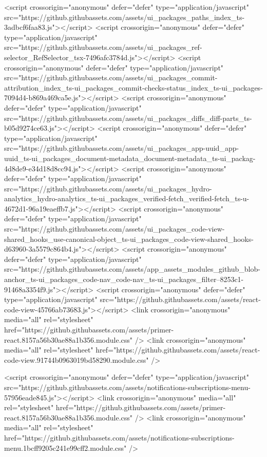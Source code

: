 <script crossorigin="anonymous" defer="defer" type="application/javascript" src="https://github.githubassets.com/assets/ui_packages_paths_index_ts-3adbcf6faa83.js"></script>
<script crossorigin="anonymous" defer="defer" type="application/javascript" src="https://github.githubassets.com/assets/ui_packages_ref-selector_RefSelector_tsx-7496afc3784d.js"></script>
<script crossorigin="anonymous" defer="defer" type="application/javascript" src="https://github.githubassets.com/assets/ui_packages_commit-attribution_index_ts-ui_packages_commit-checks-status_index_ts-ui_packages-7094d4-b869a469ca5e.js"></script>
<script crossorigin="anonymous" defer="defer" type="application/javascript" src="https://github.githubassets.com/assets/ui_packages_diffs_diff-parts_ts-b05d9274ce63.js"></script>
<script crossorigin="anonymous" defer="defer" type="application/javascript" src="https://github.githubassets.com/assets/ui_packages_app-uuid_app-uuid_ts-ui_packages_document-metadata_document-metadata_ts-ui_packag-4d8de9-e34d18d8cc94.js"></script>
<script crossorigin="anonymous" defer="defer" type="application/javascript" src="https://github.githubassets.com/assets/ui_packages_hydro-analytics_hydro-analytics_ts-ui_packages_verified-fetch_verified-fetch_ts-u-4672d1-96a19eaeffb7.js"></script>
<script crossorigin="anonymous" defer="defer" type="application/javascript" src="https://github.githubassets.com/assets/ui_packages_code-view-shared_hooks_use-canonical-object_ts-ui_packages_code-view-shared_hooks-d63960-3a5579c864b4.js"></script>
<script crossorigin="anonymous" defer="defer" type="application/javascript" src="https://github.githubassets.com/assets/app_assets_modules_github_blob-anchor_ts-ui_packages_code-nav_code-nav_ts-ui_packages_filter--8253c1-91468a3354f9.js"></script>
<script crossorigin="anonymous" defer="defer" type="application/javascript" src="https://github.githubassets.com/assets/react-code-view-45766ab73683.js"></script>
<link crossorigin="anonymous" media="all" rel="stylesheet" href="https://github.githubassets.com/assets/primer-react.8157a56b30ae88a1b356.module.css" />
<link crossorigin="anonymous" media="all" rel="stylesheet" href="https://github.githubassets.com/assets/react-code-view.91744b0963019bd58290.module.css" />

  <script crossorigin="anonymous" defer="defer" type="application/javascript" src="https://github.githubassets.com/assets/notifications-subscriptions-menu-57956eade845.js"></script>
<link crossorigin="anonymous" media="all" rel="stylesheet" href="https://github.githubassets.com/assets/primer-react.8157a56b30ae88a1b356.module.css" />
<link crossorigin="anonymous" media="all" rel="stylesheet" href="https://github.githubassets.com/assets/notifications-subscriptions-menu.1bcff9205c241e99cff2.module.css" />


